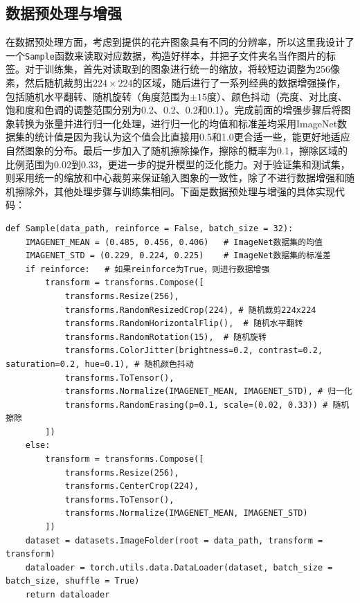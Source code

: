 \documentclass[11pt]{article}
\begin{document}
	\subsection{数据预处理与增强}
	在数据预处理方面，考虑到提供的花卉图象具有不同的分辨率，所以这里我设计了一个\lstinline|Sample|函数来读取对应数据，构造好样本，并把子文件夹名当作图片的标签。对于训练集，首先对读取到的图象进行统一的缩放，将较短边调整为256像素，然后随机裁剪出$224\times 224$的区域，随后进行了一系列经典的数据增强操作，包括随机水平翻转、随机旋转（角度范围为$\pm 15$度）、颜色抖动（亮度、对比度、饱和度和色调的调整范围分别为0.2、0.2、0.2和0.1）。完成前面的增强步骤后将图象转换为张量并进行归一化处理，进行归一化的均值和标准差均采用ImageNet数据集的统计值是因为我认为这个值会比直接用0.5和1.0更合适一些，能更好地适应自然图象的分布。最后一步加入了随机擦除操作，擦除的概率为0.1，擦除区域的比例范围为0.02到0.33，更进一步的提升模型的泛化能力。对于验证集和测试集，则采用统一的缩放和中心裁剪来保证输入图象的一致性，除了不进行数据增强和随机擦除外，其他处理步骤与训练集相同。下面是数据预处理与增强的具体实现代码：
	\begin{lstlisting}
def Sample(data_path, reinforce = False, batch_size = 32):
    IMAGENET_MEAN = (0.485, 0.456, 0.406)   # ImageNet数据集的均值
    IMAGENET_STD = (0.229, 0.224, 0.225)    # ImageNet数据集的标准差
    if reinforce:   # 如果reinforce为True，则进行数据增强
        transform = transforms.Compose([
            transforms.Resize(256),
            transforms.RandomResizedCrop(224), # 随机裁剪224x224
            transforms.RandomHorizontalFlip(),  # 随机水平翻转
            transforms.RandomRotation(15),  # 随机旋转
            transforms.ColorJitter(brightness=0.2, contrast=0.2, saturation=0.2, hue=0.1), # 随机颜色抖动
            transforms.ToTensor(),
            transforms.Normalize(IMAGENET_MEAN, IMAGENET_STD), # 归一化
            transforms.RandomErasing(p=0.1, scale=(0.02, 0.33)) # 随机擦除
        ])
    else:
        transform = transforms.Compose([
            transforms.Resize(256),
            transforms.CenterCrop(224),
            transforms.ToTensor(),
            transforms.Normalize(IMAGENET_MEAN, IMAGENET_STD)
        ])
    dataset = datasets.ImageFolder(root = data_path, transform = transform)
    dataloader = torch.utils.data.DataLoader(dataset, batch_size = batch_size, shuffle = True)
    return dataloader
	\end{lstlisting}
\end{document}

